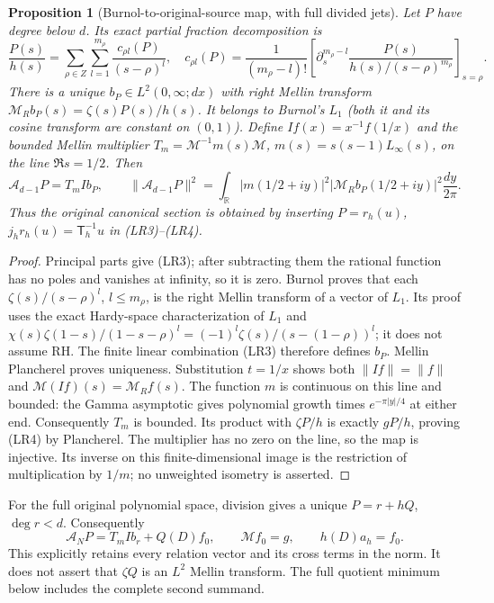 \documentclass[11pt]{article}
\newtheorem{proposition}[theorem]{Proposition}
\theoremstyle{remark}\newtheorem{remark}[theorem]{Remark}
\begin{document}
\begin{proposition}[Burnol-to-original-source map, with full divided jets]
Let $P$ have degree below $d$. Its exact partial fraction decomposition is
\[
 \frac{P(s)}{h(s)}=\sum_{\rho\in Z}\sum_{l=1}^{m_\rho}
 \frac{c_{\rho l}(P)}{(s-\rho)^l},\quad
 c_{\rho l}(P)=\frac1{(m_\rho-l)!}
 \left[\partial_s^{m_\rho-l}\frac{P(s)}{h(s)/(s-\rho)^{m_\rho}}
 \right]_{s=\rho}.\tag{LR3}
\]
There is a unique $b_P\in L^2(0,\infty;dx)$ with right Mellin transform
$\mathcal M_Rb_P(s)=\zeta(s)P(s)/h(s)$. It belongs to Burnol's
$L_1$ (both it and its cosine transform are constant on $(0,1)$).
Define $If(x)=x^{-1}f(1/x)$ and the bounded Mellin multiplier
$T_m=\mathcal M^{-1}m(s)\mathcal M$, $m(s)=s(s-1)L_\infty(s)$,
on the line $\Re s=1/2$. Then
\[
 \mathcal A_{d-1}P=T_m I b_P,\qquad
 \|\mathcal A_{d-1}P\|^2=
 \int_{\mathbb R}|m(1/2+iy)|^2
 |\mathcal M_Rb_P(1/2+iy)|^2\frac{dy}{2\pi}.\tag{LR4}
\]
Thus the original canonical section is obtained by inserting
$P=r_h(u)$, $j_hr_h(u)=\mathsf T_h^{-1}u$ in (LR3)--(LR4).
\end{proposition}
\begin{proof}
Principal parts give (LR3); after subtracting them the rational function
has no poles and vanishes at infinity, so it is zero. Burnol
\cite[\S4, Proposition \texttt{zetaprop} and its proof]{Burnol}
proves that each $\zeta(s)/(s-\rho)^l$, $l\le m_\rho$, is the
right Mellin transform of a vector of $L_1$. Its proof uses the exact
Hardy-space characterization of $L_1$ and
$\chi(s)\zeta(1-s)/(1-s-\rho)^l
=(-1)^l\zeta(s)/(s-(1-\rho))^l$; it does not assume RH.
The finite linear combination (LR3) therefore defines $b_P$.
Mellin Plancherel proves uniqueness.
Substitution $t=1/x$ shows both $\|If\|=\|f\|$ and
$\mathcal M(If)(s)=\mathcal M_Rf(s)$. The function $m$ is continuous
on this line and bounded: the Gamma asymptotic
\cite[5.11.9]{DLMF5} gives polynomial growth times
$e^{-\pi|y|/4}$ at either end. Consequently $T_m$ is bounded.
Its product with $\zeta P/h$ is exactly $gP/h$, proving (LR4) by
Plancherel. The multiplier has no zero on the line, so the map is
injective. Its inverse on this finite-dimensional image is the
restriction of multiplication by $1/m$; no unweighted isometry is asserted.
\end{proof}

For the full original polynomial space, division gives a unique
$P=r+hQ$, $\deg r<d$. Consequently
\[
 \mathcal A_NP=T_m I b_r+Q(D)f_0,\qquad
 \mathcal M f_0=g,\qquad h(D)a_h=f_0.\tag{LR5}
\]
This explicitly retains every relation vector and its cross terms in
the norm. It does not assert that $\zeta Q$ is an $L^2$ Mellin transform.
The full quotient minimum below includes the complete second summand.
\end{document}
